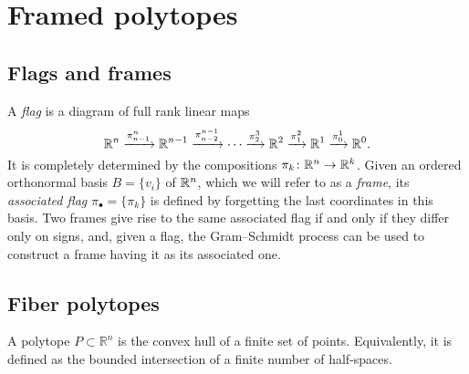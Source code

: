 
\section{Framed polytopes}


\subsection{Flags and frames}

A \emph{flag} is a diagram of full rank linear maps
\[
\mathbb{R}^n \xrightarrow{\pi^n_{n-1}} \mathbb{R}^{n-1} \xrightarrow{\pi^{n-1}_{n-2}} \dotsb \xrightarrow{\pi^3_{2}} \mathbb{R}^2 \xrightarrow{\pi^2_1} \mathbb{R}^1 \xrightarrow{\pi^1_0} \mathbb{R}^0.
\]
It is completely determined by the compositions
$\pi_k \colon \mathbb{R}^n \to \mathbb{R}^k$.
Given an ordered orthonormal basis $B = \{v_i\}$ of $\mathbb{R}^n$, which we will refer to as a \textit{frame}, its \emph{associated flag} $\pi_\bullet = \{\pi_k\}$ is defined by forgetting the last coordinates in this basis.
Two frames give rise to the same associated flag if and only if they differ only on signs, and, given a flag, the Gram--Schmidt process can be used to construct a frame having it as its associated one.

%

\subsection{Fiber polytopes}

A polytope $P \subset \mathbb{R}^n$ is the convex hull of a finite set of points.
Equivalently, it is defined as the bounded intersection of a finite number of half-spaces.

